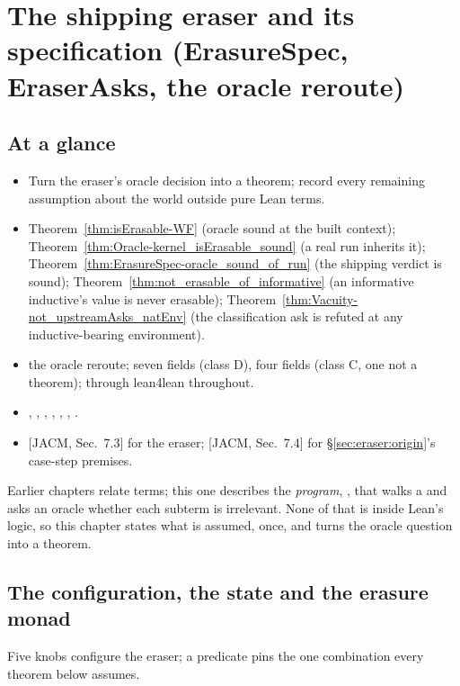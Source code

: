 \chapter{The shipping eraser and its specification (ErasureSpec, EraserAsks, the oracle reroute)}
\label{chap:eraser}

\section*{At a glance}
\begin{itemize}
\item {} Turn the eraser's oracle decision into a theorem; record every remaining
assumption about the world outside pure Lean terms.
\item {} Theorem~\ref{thm:isErasable-WF} (oracle sound at the built context);
Theorem~\ref{thm:Oracle-kernel_isErasable_sound} (a real run inherits it);
Theorem~\ref{thm:ErasureSpec-oracle_sound_of_run} (the shipping verdict is sound);
Theorem~\ref{thm:not_erasable_of_informative} (an informative inductive's value is never erasable);
Theorem~\ref{thm:Vacuity-not_upstreamAsks_natEnv} (the classification ask is refuted at any
inductive-bearing environment).
\item {} \stProved{} the oracle reroute; \stAssumed{} seven  fields
(class D), four  fields (class C, one not a theorem); \stInherited{} through
lean4lean throughout.
\item {} , , ,
, , , .
\item {} [JACM, Sec.~7.3] for the eraser; [JACM, Sec.~7.4] for \S\ref{sec:eraser:origin}'s
case-step premises.
\end{itemize}

Earlier chapters relate terms; this one describes the \emph{program}, , that
walks a  and asks an oracle whether each subterm is irrelevant. None of that is
inside Lean's logic, so this chapter states what is assumed, once, and turns the oracle question
into a theorem.

\section{The configuration, the state and the erasure monad}
\label{sec:eraser:config}
Five knobs configure the eraser; a predicate pins the one combination every theorem below assumes.

